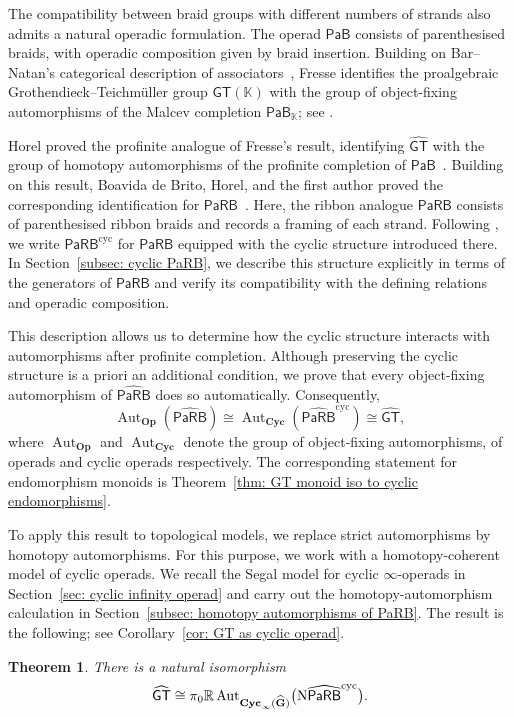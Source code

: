 \documentclass{amsart}
\newcommand{\Grpd}{\mathbf{G}}
\newcommand{\kk}{\mathbb{K}}    %
\newcommand{\PaRB}{\mathsf{PaRB}}
\newcommand{\PaB}{\mathsf{PaB}}
\newcommand{\Cyc}{\mathbf{Cyc}}
\newcommand{\Op}{\mathbf{Op}}
\newcommand{\Aut}{\operatorname{Aut}}
\newcommand{\nerve}{\textnormal{N}}
\newcommand{\gt}{\mathsf{GT}}
\newcommand{\GT}{\widehat{\mathsf{GT}}}
\newtheorem*{thm*}{Theorem}
\theoremstyle{definition}
\numberwithin{equation}{section}
\begin{document}
The compatibility between braid groups with different numbers of
strands also admits a natural operadic formulation. The operad
$\PaB$ consists of parenthesised braids, with operadic composition
given by braid insertion. Building on Bar--Natan's categorical
description of associators~\cite{BN}, Fresse identifies the
proalgebraic Grothendieck--Teichmüller group $\gt(\kk)$ with the
group of object-fixing automorphisms of the Malcev completion
$\PaB_{\kk}$; see \cite[Theorem~11.1.7]{FresseBook1}.

Horel proved the profinite analogue of Fresse's result, identifying
$\GT$ with the group of homotopy automorphisms of the profinite
completion of $\PaB$~\cite{Horel_profinite_groupoids}. Building on
this result, Boavida de Brito, Horel, and the first author proved the
corresponding identification for
$\PaRB$~\cite{Boavida-Horel-Robertson}. Here, the ribbon analogue
$\PaRB$ consists of parenthesised ribbon braids and records a framing
of each strand. Following \cite{campos2019configuration}, we write
$\PaRB^{\mathrm{cyc}}$ for $\PaRB$ equipped with the cyclic structure
introduced there. In Section~\ref{subsec: cyclic PaRB}, we describe
this structure explicitly in terms of the generators of $\PaRB$ and
verify its compatibility with the defining relations and operadic
composition.

This description allows us to determine how the cyclic structure
interacts with automorphisms after profinite completion. Although
preserving the cyclic structure is a priori an additional condition,
we prove that every object-fixing automorphism of
$\widehat{\PaRB}$ does so automatically. Consequently,
\[
\Aut_{\Op}(\widehat{\PaRB})
\cong
\Aut_{\Cyc}(\widehat{\PaRB}^{\mathrm{cyc}})
\cong
\GT,
\]
where $\Aut_{\Op}$ and $\Aut_{\Cyc}$ denote the group of object-fixing automorphisms, of
operads and cyclic operads respectively. The corresponding
statement for endomorphism monoids is
Theorem~\ref{thm: GT monoid iso to cyclic endomorphisms}.

To apply this result to topological models, we replace strict
automorphisms by homotopy automorphisms. For this purpose, we work
with a homotopy-coherent model of cyclic operads. We recall the Segal
model for cyclic $\infty$-operads in
Section~\ref{sec: cyclic infinity operad} and carry out the
homotopy-automorphism calculation in
Section~\ref{subsec: homotopy automorphisms of PaRB}. The result is
the following; see Corollary~\ref{cor: GT as cyclic operad}.

\begin{thm*}
There is a natural isomorphism
\[
\GT
\cong
\pi_0\mathbb R\Aut_{\Cyc_\infty(\widehat{\Grpd})}
\bigl(
\nerve\widehat{\PaRB}^{\mathrm{cyc}}
\bigr).
\]
\end{thm*}
\end{document}
